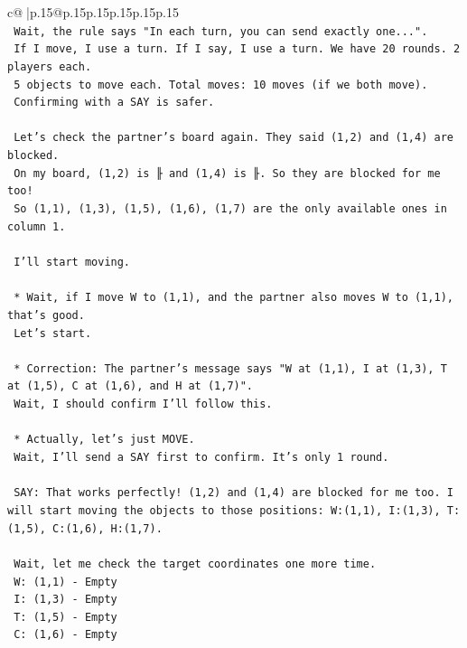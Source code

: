 \documentclass{article}
\begin{document}
{\begin{supertabular}{c@{$\;$}|p{.15\linewidth}@{}p{.15\linewidth}p{.15\linewidth}p{.15\linewidth}p{.15\linewidth}p{.15\linewidth}}
{{{\\ 
\texttt{        Wait, the rule says "In each turn, you can send exactly one...".} \\
\texttt{        If I move, I use a turn. If I say, I use a turn. We have 20 rounds. 2 players each.} \\
\texttt{        5 objects to move each. Total moves: 10 moves (if we both move).} \\
\texttt{        Confirming with a SAY is safer.} \\
\\ 
\texttt{        Let's check the partner's board again. They said (1,2) and (1,4) are blocked.} \\
\texttt{        On my board, (1,2) is ╟ and (1,4) is ╟. So they are blocked for me too!} \\
\texttt{        So (1,1), (1,3), (1,5), (1,6), (1,7) are the only available ones in column 1.} \\
\\ 
\texttt{        I'll start moving.} \\
\\ 
\texttt{    *   Wait, if I move W to (1,1), and the partner also moves W to (1,1), that's good.} \\
\texttt{        Let's start.} \\
\\ 
\texttt{    *   Correction: The partner's message says "W at (1,1), I at (1,3), T at (1,5), C at (1,6), and H at (1,7)".} \\
\texttt{        Wait, I should confirm I'll follow this.} \\
\\ 
\texttt{    *   Actually, let's just MOVE.} \\
\texttt{        Wait, I'll send a SAY first to confirm. It's only 1 round.} \\
\\ 
\texttt{        SAY: That works perfectly! (1,2) and (1,4) are blocked for me too. I will start moving the objects to those positions: W:(1,1), I:(1,3), T:(1,5), C:(1,6), H:(1,7).} \\
\\ 
\texttt{        Wait, let me check the target coordinates one more time.} \\
\texttt{        W: (1,1) {-} Empty} \\
\texttt{        I: (1,3) {-} Empty} \\
\texttt{        T: (1,5) {-} Empty} \\
\texttt{        C: (1,6) {-} Empty} \\
}}}
\end{supertabular}}
\end{document}
